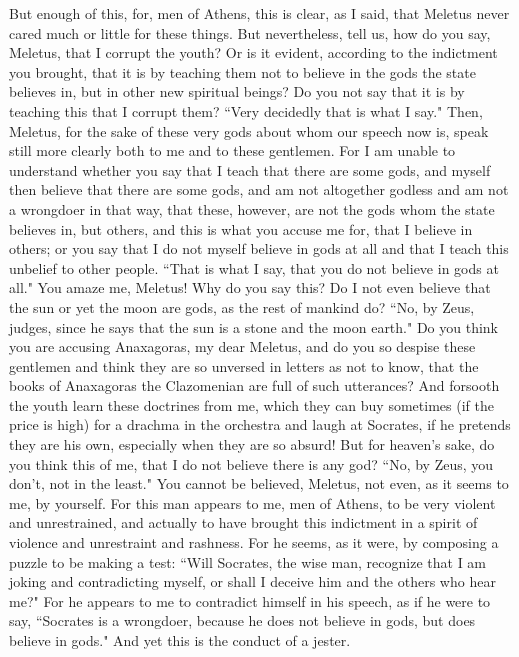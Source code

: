 \documentclass[letterpaper,12pt]{article}
\newcommand{\stephpag}[1]{\marginnote{\small\itshape\fontfamily{ppl}\selectfont #1}}
\begin{document}
But enough of this, for, men of Athens, this is clear, as I said, that Meletus never \stephpag{b} cared much or little for these things. But nevertheless, tell us, how do you say, Meletus, that I corrupt the youth? Or is it evident, according to the indictment you brought, that it is by teaching them not to believe in the gods the state believes in, but in other new spiritual beings? Do you not say that it is by teaching this that I corrupt them? ``Very decidedly that is what I say." Then, Meletus, for the sake of \stephpag{c} these very gods about whom our speech now is, speak still more clearly both to me and to these gentlemen. For I am unable to understand whether you say that I teach that there are some gods, and myself then believe that there are some gods, and am not altogether godless and am not a wrongdoer in that way, that these, however, are not the gods whom the state believes in, but others, and this is what you accuse me for, that I believe in others; or you say that I do not myself believe in gods at all and that I teach this unbelief to other people. ``That is what I say, that you do not believe in gods at all." You amaze me, Meletus! Why do you say this? \stephpag{d} Do I not even believe that the sun or yet the moon are gods, as the rest of mankind do? ``No, by Zeus, judges, since he says that the sun is a stone and the moon earth." Do you think you are accusing Anaxagoras, my dear Meletus, and do you so despise these gentlemen and think they are so unversed in letters as not to know, that the books of Anaxagoras the Clazomenian are full of such utterances? And forsooth the youth learn these doctrines from me, which they can buy sometimes \stephpag{e} (if the price is high) for a drachma in the orchestra and laugh at Socrates, if he pretends they are his own, especially when they are so absurd! But for heaven's sake, do you think this of me, that I do not believe there is any god? ``No, by Zeus, you don't, not in the least." You cannot be believed, Meletus, not even, as it seems to me, by yourself. For this man appears to me, men of Athens, to be very violent and unrestrained, and actually to have brought this indictment in a spirit of violence and unrestraint and rashness. For he seems, \stephpag{27 a} as it were, by composing a puzzle to be making a test: ``Will Socrates, the wise man, recognize that I am joking and contradicting myself, or shall I deceive him and the others who hear me?" For he appears to me to contradict himself in his speech, as if he were to say, ``Socrates is a wrongdoer, because he does not believe in gods, but does believe in gods." And yet this is the conduct of a jester.
\end{document}
